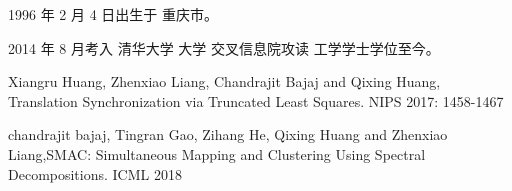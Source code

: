 \begin{resume}


  1996 年 2 月 4 日出生于 重庆市。

  2014 年 8 月考入 清华大学 大学 交叉信息院攻读 工学学士学位至今。

  
  \begin{publications}
  	\item 	Xiangru Huang, Zhenxiao Liang, Chandrajit Bajaj and Qixing Huang,
  	Translation Synchronization via Truncated Least Squares. NIPS 2017: 1458-1467
  	\item chandrajit bajaj, Tingran Gao, Zihang He, Qixing Huang and Zhenxiao Liang,SMAC: Simultaneous Mapping and Clustering Using Spectral Decompositions. ICML 2018
  \end{publications}

\end{resume}
